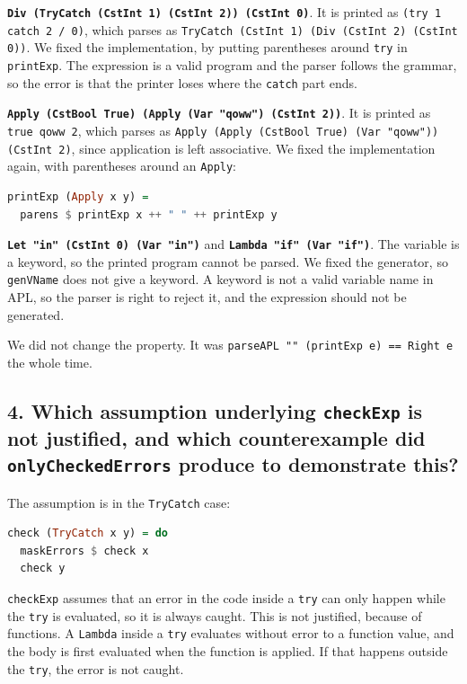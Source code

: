 \textbf{\texttt{Div (TryCatch (CstInt 1) (CstInt 2)) (CstInt 0)}}. It is printed as \texttt{(try 1 catch 2 / 0)}, which parses as \texttt{TryCatch (CstInt 1) (Div (CstInt 2) (CstInt 0))}. We fixed the implementation, by putting parentheses around \texttt{try} in \texttt{printExp}. The expression is a valid program and the parser follows the grammar, so the error is that the printer loses where the \texttt{catch} part ends.

\textbf{\texttt{Apply (CstBool True) (Apply (Var "qoww") (CstInt 2))}}. It is printed as \texttt{true qoww 2}, which parses as \texttt{Apply (Apply (CstBool True) (Var "qoww")) (CstInt 2)}, since application is left associative. We fixed the implementation again, with parentheses around an \texttt{Apply}:

\begin{lstlisting}[language=Haskell]
printExp (Apply x y) =
  parens $ printExp x ++ " " ++ printExp y
\end{lstlisting}

\textbf{\texttt{Let "in" (CstInt 0) (Var "in")}} and \textbf{\texttt{Lambda "if" (Var "if")}}. The variable is a keyword, so the printed program cannot be parsed. We fixed the generator, so \texttt{genVName} does not give a keyword. A keyword is not a valid variable name in APL, so the parser is right to reject it, and the expression should not be generated.

We did not change the property. It was \texttt{parseAPL "" (printExp e) == Right e} the whole time.

\subsection[Question 4]{4. Which assumption underlying \texttt{checkExp} is not justified, and which counterexample did \texttt{onlyCheckedErrors} produce to demonstrate this?}

The assumption is in the \texttt{TryCatch} case:

\begin{lstlisting}[language=Haskell]
check (TryCatch x y) = do
  maskErrors $ check x
  check y
\end{lstlisting}

\texttt{checkExp} assumes that an error in the code inside a \texttt{try} can only happen while the \texttt{try} is evaluated, so it is always caught. This is not justified, because of functions. A \texttt{Lambda} inside a \texttt{try} evaluates without error to a function value, and the body is first evaluated when the function is applied. If that happens outside the \texttt{try}, the error is not caught.


